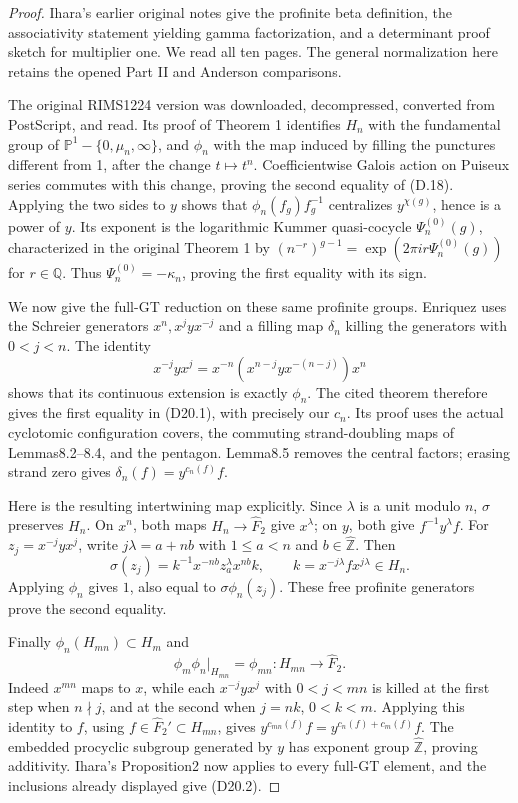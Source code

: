 \begin{proof}
Ihara's earlier original notes \cite[Sections2--4, pp.46--52]{dIhara1997Kokyuroku} give the profinite beta definition, the associativity statement yielding gamma factorization, and a determinant proof sketch for multiplier one. We read all ten pages. The general normalization here retains the opened Part II and Anderson comparisons.

The original RIMS1224 version was downloaded, decompressed, converted from PostScript, and read. Its proof of Theorem 1 identifies $H_n$ with the fundamental group of $\mathbb P^1-\{0,\mu_n,\infty\}$, and $\phi_n$ with the map induced by filling the punctures different from 1, after the change $t\mapsto t^n$. Coefficientwise Galois action on Puiseux series commutes with this change, proving the second equality of (D.18). Applying the two sides to $y$ shows that $\phi_n(f_g)f_g^{-1}$ centralizes $y^{\chi(g)}$, hence is a power of $y$. Its exponent is the logarithmic Kummer quasi-cocycle $\Psi_n^{(0)}(g)$, characterized in the original Theorem 1 by
$(n^{-r})^{g-1}=\exp(2\pi i r\Psi_n^{(0)}(g))$ for $r\in\mathbb Q$.
Thus $\Psi_n^{(0)}=-\kappa_n$, proving the first equality with its sign.

We now give the full-GT reduction on these same profinite groups.
Enriquez uses the Schreier generators
$x^n,x^j yx^{-j}$ and a filling map $\delta_n$ killing
the generators with $0<j<n$. The identity
\[
 x^{-j}yx^j=x^{-n}(x^{n-j}yx^{-(n-j)})x^n
\]
shows that its continuous extension is exactly $\phi_n$.
The cited theorem therefore gives the first equality in
(D20.1), with precisely our $c_n$.
Its proof uses the actual cyclotomic configuration covers,
the commuting strand-doubling maps of Lemmas8.2--8.4,
and the pentagon. Lemma8.5 removes the central factors;
erasing strand zero gives $\delta_n(f)=y^{c_n(f)}f$.

Here is the resulting intertwining map explicitly.
Since $\lambda$ is a unit modulo $n$, $\sigma$ preserves
$H_n$. On $x^n$, both maps $H_n\to\widehat F_2$ give
$x^\lambda$; on $y$, both give $f^{-1}y^\lambda f$.
For $z_j=x^{-j}yx^j$, write
$j\lambda=a+nb$ with $1\leq a<n$ and
$b\in\widehat{\mathbb Z}$. Then
\[
 \sigma(z_j)=k^{-1}x^{-nb}z_a^\lambda x^{nb}k,
 \qquad k=x^{-j\lambda}fx^{j\lambda}\in H_n.
\]
Applying $\phi_n$ gives $1$, also equal to
$\sigma\phi_n(z_j)$. These free profinite generators
prove the second equality.

Finally $\phi_n(H_{mn})\subset H_m$ and
\[
 \phi_m\phi_n|_{H_{mn}}=\phi_{mn}:
                       H_{mn}\longrightarrow\widehat F_2.
\]
Indeed $x^{mn}$ maps to $x$, while each
$x^{-j}yx^j$ with $0<j<mn$ is killed at the first step
when $n\nmid j$, and at the second when $j=nk$,
$0<k<m$. Applying this identity to $f$, using
$f\in\widehat F_2'\subset H_{mn}$, gives
$y^{c_{mn}(f)}f=y^{c_n(f)+c_m(f)}f$.
The embedded procyclic subgroup generated by $y$ has
exponent group $\widehat{\mathbb Z}$, proving additivity.
Ihara's Proposition2 now applies to every full-GT element,
and the inclusions already displayed give (D20.2).


\end{proof}
